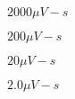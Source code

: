 \documentclass[journal,12pt,onecolumn]{IEEEtran}
\theoremstyle{remark}
\begin{document}
\begin{enumerate}
\begin{enumerate}
				\begin{enumerate}
				\end{enumerate}
		\end{enumerate}
\end{enumerate}
\end{document}
